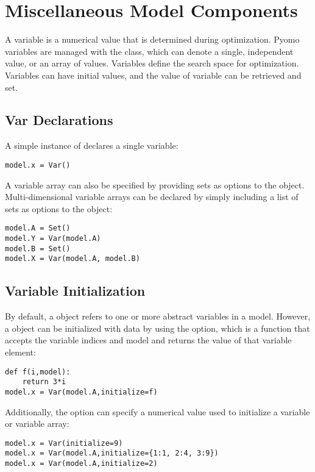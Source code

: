 \section{Miscellaneous Model Components}

A variable is a numerical value that is determined during optimization.
Pyomo variables are managed with the  class, which can denote
a single, independent value, or an array of values.  Variables define
the search space for optimization.  Variables can have initial values,
and the value of variable can be retrieved and set.


\subsection{Var Declarations}

A simple instance of  declares a single variable:
\begin{lstlisting}
model.x = Var()
\end{lstlisting}
A variable array can also be specified by providing sets as options
to the  object.  Multi-dimensional variable arrays can be declared by simply including a list of sets as options to the  object:
\begin{lstlisting}
model.A = Set()
model.Y = Var(model.A)
model.B = Set()
model.X = Var(model.A, model.B)
\end{lstlisting}


\subsection{Variable Initialization}

By default, a  object refers to one or more abstract variables in a model.  However,
a  object can be initialized with data by using the  option, which is a function 
that accepts the variable indices and model and returns the value of that variable element:
\begin{lstlisting}
def f(i,model):
    return 3*i
model.x = Var(model.A,initialize=f)
\end{lstlisting}
Additionally, the  option can specify a numerical value used to 
initialize a variable or variable array:
\begin{lstlisting}
model.x = Var(initialize=9)
model.x = Var(model.A,initialize={1:1, 2:4, 3:9})
model.x = Var(model.A,initialize=2)
\end{lstlisting}


